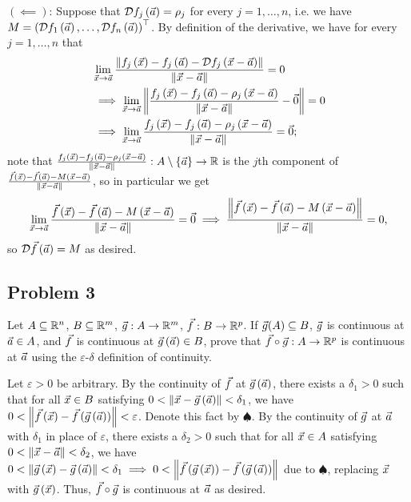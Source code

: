 \documentclass[main.tex]{subfiles}
\begin{document}
\begin{soln}
    $(\impliedby)$: Suppose that $\mathcal{D}f_j\left( \vec{a} \right) = \rho_j$ for every $j = 1, \ldots , n$, i.e. we have $M = \left( \mathcal{D}f_1\left( \vec{a} \right), \ldots , \mathcal{D}f_n\left( \vec{a} \right) \right)^\top$. By definition of the derivative, we have for every $j = 1, \ldots , n$ that
    \begin{align*}
        &\lim_{\vec{x}\to \vec{a}} \frac{\left\lVert f_j\left( \vec{x} \right) - f_j\left( \vec{a} \right) - \mathcal{D}f_j\left( \vec{x} - \vec{a} \right) \right\rVert}{\left\lVert \vec{x} - \vec{a} \right\rVert} = 0 \\
        &\implies\lim_{\vec{x}\to \vec{a}} \left\lVert \frac{f_j\left( \vec{x} \right) - f_j\left( \vec{a} \right) - \rho_j\left( \vec{x} - \vec{a} \right)}{\left\lVert \vec{x} - \vec{a} \right\rVert} - \vec{0} \right\rVert = 0 \\
        &\implies \lim_{\vec{x}\to \vec{a}} \frac{f_j\left( \vec{x} \right) - f_j\left( \vec{a} \right) - \rho_j\left( \vec{x} - \vec{a} \right)}{\left\lVert \vec{x} - \vec{a} \right\rVert} = \vec{0};
    \end{align*}
    note that $\frac{f_j\left( \vec{x} \right) - f_j\left( \vec{a} \right) - \rho_j\left( \vec{x} - \vec{a} \right)}{\left\lVert \vec{x} - \vec{a} \right\rVert} : A\setminus\left\{ \vec{a} \right\}\to \mathbb R$ is the $j$th component of $\frac{\vec{f}\left( \vec{x} \right) - \vec{f}\left( \vec{a} \right) - M\left( \vec{x} - \vec{a} \right)}{\left\lVert \vec{x} - \vec{a} \right\rVert}$, so in particular we get
    \[\lim_{\vec{x}\to \vec{a}} \frac{\vec{f}\left( \vec{x} \right) - \vec{f}\left( \vec{a} \right) - M\left( \vec{x} - \vec{a} \right)}{\left\lVert \vec{x} - \vec{a} \right\rVert} = \vec{0}\implies \frac{\left\lVert \vec{f}\left( \vec{x} \right) - \vec{f}\left( \vec{a} \right) - M\left( \vec{x} - \vec{a} \right) \right\rVert}{\left\lVert \vec{x} - \vec{a} \right\rVert} = 0,\]
    so $\mathcal{D}\vec{f}\left( \vec{a} \right) = M$ as desired.
\end{soln}
\eject

\subsection{Problem 3}
\begin{claim}
    Let $A \subseteq \mathbb R^n$, $B \subseteq \mathbb R^m$, $\vec{g} : A \to \mathbb R^m$, $\vec{f} : B \to \mathbb R^p$. If $\vec{g}(A) \subseteq B$, $\vec{g}$ is continuous at $\vec{a} \in A$, and $\vec{f}$ is continuous at $\vec{g}\left( \vec{a} \right) \in B$, prove that $\vec{f} \circ \vec{g} : A \to \mathbb R^p$ is continuous at $\vec{a}$ using the $\varepsilon$-$\delta$ definition of continuity.
\end{claim}

\begin{soln}
    Let $\varepsilon > 0$ be arbitrary. By the continuity of $\vec{f}$ at $\vec{g}\left( \vec{a} \right)$, there exists a $\delta_1 > 0$ such that for all $\vec{x}\in B$ satisfying $0 < \left\lVert \vec{x} - \vec{g}\left( \vec{a} \right) \right\rVert < \delta_1$, we have $0 < \left\lVert \vec{f}\left( \vec{x} \right) - \vec{f}\left( \vec{g}\left( \vec{a} \right) \right) \right\rVert < \varepsilon$. Denote this fact by $\spadesuit$. By the continuity of $\vec{g}$ at $\vec{a}$ with $\delta_1$ in place of $\varepsilon$, there exists a $\delta_2 > 0$ such that for all $\vec{x}\in A$ satisfying $0 < \left\lVert \vec{x} - \vec{a} \right\rVert < \delta_2$, we have $0 < \left\lVert \vec{g}\left( \vec{x} \right) - \vec{g}\left( \vec{a} \right) \right\rVert < \delta_1\implies 0 < \left\lVert \vec{f}\left( \vec{g}\left( \vec{x} \right) \right) - \vec{f}\left( \vec{g}\left( \vec{a} \right) \right) \right\rVert$ due to $\spadesuit$, replacing $\vec{x}$ with $\vec{g}\left( \vec{x} \right)$. Thus, $\vec{f}\circ \vec{g}$ is continuous at $\vec{a}$ as desired.
\end{soln}
\eject
\end{document}
